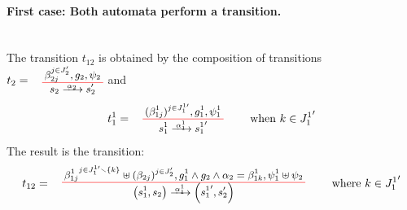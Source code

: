 \documentclass[runningheads]{llncs}
\begin{document}
\begin{enumerate}
\paragraph{First case: Both automata perform a transition.} ~~\\
The transition $t_{12}$ is obtained  by the composition of transitions $t_2=\OTx{2}{}{2}{2}$ and  \[t_1^1=
\OT{ s^1_1}{{s^1_1}'}{\alpha_1^1}{   {(\beta^1_{1j})^{j \in J^{1 \prime}_1} }}{ g^1_1 }{ \psi^1_1} \qquad \text{ when } k \in {J^1_{1}}^{\prime}
\]
The result is the transition:
\[
t_{12} = \OT{\mpar{s^1_1, s_2}}{\mpar{{s^1_1}',s'_2 }}{\alpha^1_1}{{\beta^1_{1j}}^{j \in J^{1 \prime}_1 \setminus \{k\}} \uplus  {(\beta_{2j})^{j \in J^{\prime}_2} }}{g^1_1 \wedge g_2 \wedge \alpha_2 = \beta^1_{1k}}{\psi^1_1 \uplus \psi_2} \qquad \text{ where } k \in {J^1_{1}}^{\prime} 
\]


\end{enumerate}
\end{document}
